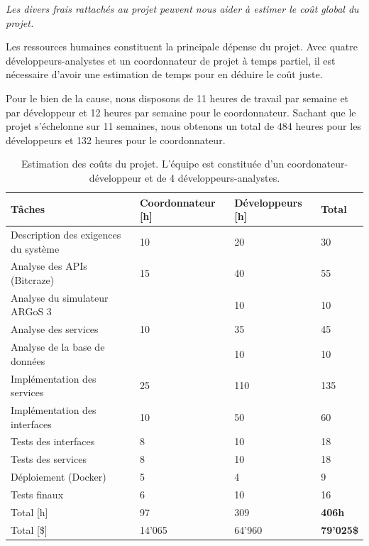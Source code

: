 \documentclass{mistcoursedoc}
\begin{document}
\textit{Les divers frais rattachés au projet peuvent nous aider à estimer le coût global du projet.}

Les ressources humaines constituent la principale dépense du projet.
Avec quatre développeurs-analystes et un coordonnateur de projet à temps partiel,
il est nécessaire d’avoir une estimation de temps pour en déduire le coût juste.

Pour le bien de la cause, nous disposons de 11 heures de travail par semaine et par développeur et 12 heures par semaine pour le coordonnateur.
Sachant que le projet s’échelonne sur 11 semaines, nous obtenons un total de 484 heures pour les développeurs
et 132 heures pour le coordonnateur.

\begin{table}[h!]
  \centering
  \begin{tabular}{M{6.5cm} M{3.5cm} M{3.5cm} M{1.5cm}}
    \hline
    \textbf{Tâches}                      & \textbf{Coordonnateur [h]} & \textbf{Développeurs [h]} & \textbf{Total} \tabularnewline\hline
    Description des exigences du système & 10                        & 20                        & 30 \tabularnewline
    Analyse des APIs (Bitcraze)          & 15                        & 40                        & 55 \tabularnewline
    Analyse du simulateur ARGoS 3        &                           & 10                        & 10 \tabularnewline
    Analyse des services                 & 10                        & 35                        & 45 \tabularnewline
    Analyse de la base de données        &                           & 10                        & 10 \tabularnewline
    Implémentation des services          & 25                        & 110                       & 135 \tabularnewline
    Implémentation des interfaces        & 10                        & 50                        & 60 \tabularnewline
    Tests des interfaces                 & 8                         & 10                        & 18 \tabularnewline
    Tests des services                   & 8                         & 10                        & 18\tabularnewline
    Déploiement (Docker)                 & 5                         & 4                         & 9\tabularnewline
    Tests finaux                         & 6                         & 10                        & 16 \tabularnewline\hline
    Total [h]                            & 97                        & 309                       & \textbf{406h} \tabularnewline
    Total [\$]                           & 14'065                    & 64'960                    & \textbf{79'025\$} \tabularnewline
    \hline
  \end{tabular}
  \caption{Estimation des coûts du projet. L'équipe est constituée d'un coordonateur-développeur et de 4 développeurs-analystes.}
\end{table}
\end{document}
